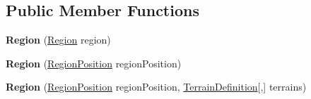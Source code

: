 \subsection*{Public Member Functions}
\begin{DoxyCompactItemize}
\item 
\hypertarget{classCore_1_1Models_1_1Region_a36ae96644a4ac7f34c2b608f56df38fc}{{\bfseries Region} (\hyperlink{classCore_1_1Models_1_1Region}{Region} region)}\label{classCore_1_1Models_1_1Region_a36ae96644a4ac7f34c2b608f56df38fc}

\item 
\hypertarget{classCore_1_1Models_1_1Region_a68736570a0df9f1e9b64d6a9d6744c02}{{\bfseries Region} (\hyperlink{classCore_1_1Models_1_1RegionPosition}{Region\-Position} region\-Position)}\label{classCore_1_1Models_1_1Region_a68736570a0df9f1e9b64d6a9d6744c02}

\item 
\hypertarget{classCore_1_1Models_1_1Region_afcf20af4ea09f9eed57e373a8a8210ea}{{\bfseries Region} (\hyperlink{classCore_1_1Models_1_1RegionPosition}{Region\-Position} region\-Position, \hyperlink{classCore_1_1Models_1_1Definitions_1_1TerrainDefinition}{Terrain\-Definition}\mbox{[},\mbox{]} terrains)}\label{classCore_1_1Models_1_1Region_afcf20af4ea09f9eed57e373a8a8210ea}


\end{DoxyCompactItemize}
